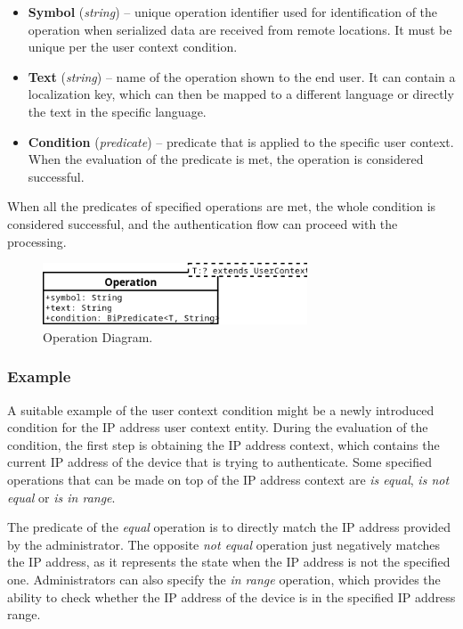 \begin{itemize}
    \item \textbf{Symbol} (\textit{string}) -- unique operation identifier used for identification of the operation when serialized data are received from remote locations. It must be unique per the user context condition.
    \item \textbf{Text} (\textit{string}) -- name of the operation shown to the end user.
    It can contain a localization key, which can then be mapped to a different language or directly the text in the specific language. 
    \item \textbf{Condition} (\textit{predicate}) -- predicate that is applied to the specific user context. When the evaluation of the predicate is met, the operation is considered successful.
\end{itemize}

When all the predicates of specified operations are met, the whole condition is considered successful, and the authentication flow can proceed with the processing.

\begin{figure}[htbp]
  \centering
  \includegraphics[width=0.7\textwidth]{img/sections/5-design/operation-diagram.png}
  \caption{Operation Diagram.}
  \label{fig:operation-diagram}
\end{figure}

\newpage

\subsubsection{Example}

A suitable example of the user context condition might be a newly introduced condition for the IP address user context entity.
During the evaluation of the condition, the first step is obtaining the IP address context, which contains the current IP address of the device that is trying to authenticate.
Some specified operations that can be made on top of the IP address context are \textit{is equal}, \textit{is not equal} or \textit{is in range}.

The predicate of the \textit{equal} operation is to directly match the IP address provided by the administrator.
The opposite \textit{not equal} operation just negatively matches the IP address, as it represents the state when the IP address is not the specified one.
Administrators can also specify the \textit{in range} operation, which provides the ability to check whether the IP address of the device is in the specified IP address range.

